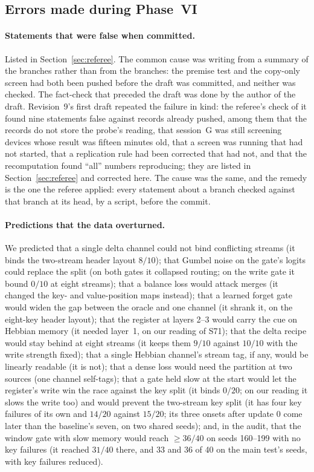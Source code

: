 \documentclass[11pt]{article}
\begin{document}
\subsection{Errors made during Phase~VI}
\label{sec:errors}

\paragraph{Statements that were false when committed.} Listed in Section~\ref{sec:referee}. The common cause was writing from a summary of the branches rather than from the branches: the premise test and the copy-only screen had both been pushed before the draft was committed, and neither was checked. The fact-check that preceded the draft was done by the author of the draft. Revision~9's first draft repeated the failure in kind: the referee's check of it found nine statements false against records already pushed, among them that the records do not store the probe's reading, that session~G was still screening devices whose result was fifteen minutes old, that a screen was running that had not started, that a replication rule had been corrected that had not, and that the recomputation found ``all'' numbers reproducing; they are listed in Section~\ref{sec:referee} and corrected here. The cause was the same, and the remedy is the one the referee applied: every statement about a branch checked against that branch at its head, by a script, before the commit.

\paragraph{Predictions that the data overturned.} We predicted that a single delta channel could not bind conflicting streams (it binds the two-stream header layout $8/10$); that Gumbel noise on the gate's logits could replace the split (on both gates it collapsed routing; on the write gate it bound $0/10$ at eight streams); that a balance loss would attack merges (it changed the key- and value-position maps instead); that a learned forget gate would widen the gap between the oracle and one channel (it shrank it, on the eight-key header layout); that the register at layers 2--3 would carry the cue on Hebbian memory (it needed layer~1, on our reading of S71); that the delta recipe would stay behind at eight streams (it keeps them $9/10$ against $10/10$ with the write strength fixed); that a single Hebbian channel's stream tag, if any, would be linearly readable (it is not); that a dense loss would need the partition at two sources (one channel self-tags); that a gate held slow at the start would let the register's write win the race against the key split (it binds $0/20$; on our reading it slows the write too) and would prevent the two-stream key split (it has four key failures of its own and $14/20$ against $15/20$; its three onsets after update 0 come later than the baseline's seven, on two shared seeds); and, in the audit, that the window gate with slow memory would reach $\geq 36/40$ on seeds 160--199 with no key failures (it reached $31/40$ there, and $33$ and $36$ of 40 on the main test's seeds, with key failures reduced).
\end{document}
